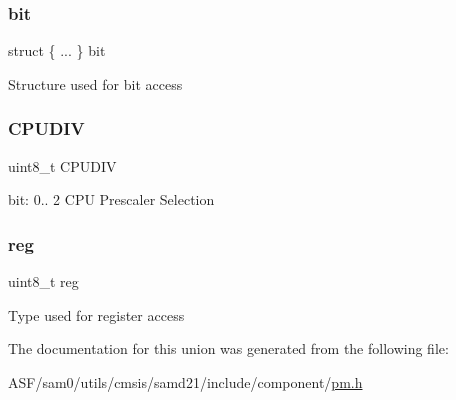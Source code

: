 \subsubsection{\texorpdfstring{bit}{bit}}
{\footnotesize\ttfamily struct \{ ... \}   bit}

Structure used for bit access \mbox{\label{union_p_m___c_p_u_s_e_l___type_a285712acd136d7f8257dece3a78fbb51}} 
\subsubsection{\texorpdfstring{CPUDIV}{CPUDIV}}
{\footnotesize\ttfamily uint8\+\_\+t C\+P\+U\+D\+IV}

bit\+: 0.. 2 C\+PU Prescaler Selection \mbox{\label{union_p_m___c_p_u_s_e_l___type_a9428adc9af4653a2050e2536b55dec8d}} 
\subsubsection{\texorpdfstring{reg}{reg}}
{\footnotesize\ttfamily uint8\+\_\+t reg}

Type used for register access 

The documentation for this union was generated from the following file\+:\begin{DoxyCompactItemize}
\item 
A\+S\+F/sam0/utils/cmsis/samd21/include/component/\mbox{\hyperlink{component_2pm_8h}{pm.\+h}}\end{DoxyCompactItemize}
